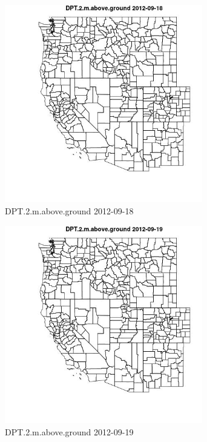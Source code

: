 \begin{figure} 
\centering  
\includegraphics[width=0.77\textwidth]{Code_Outputs/ML_input_report_ML_input_PM25_Step5_part_d_de_duplicated_aves_ML_input_MapObsDPT2maboveground2012-09-18.jpg} 
\caption{\label{fig:ML_input_report_ML_input_PM25_Step5_part_d_de_duplicated_aves_ML_inputMapObsDPT2maboveground2012-09-18}DPT.2.m.above.ground 2012-09-18} 
\end{figure} 
 

\begin{figure} 
\centering  
\includegraphics[width=0.77\textwidth]{Code_Outputs/ML_input_report_ML_input_PM25_Step5_part_d_de_duplicated_aves_ML_input_MapObsDPT2maboveground2012-09-19.jpg} 
\caption{\label{fig:ML_input_report_ML_input_PM25_Step5_part_d_de_duplicated_aves_ML_inputMapObsDPT2maboveground2012-09-19}DPT.2.m.above.ground 2012-09-19} 
\end{figure} 
 

